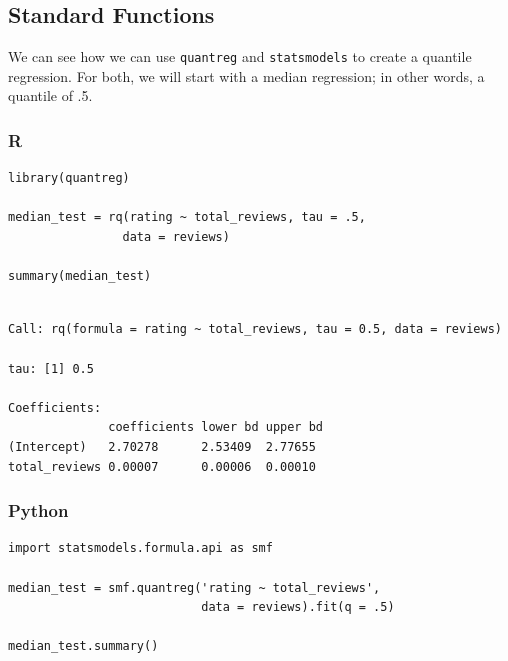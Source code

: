 \documentclass[
  letterpaper,
]{krantz}
\begin{document}
\subsection{Standard Functions}\label{sec-quantile-standard}

We can see how we can use \texttt{quantreg} and \texttt{statsmodels} to
create a quantile regression. For both, we will start with a median
regression; in other words, a quantile of .5.

\subsubsection{R}

\begin{verbatim}
library(quantreg)

median_test = rq(rating ~ total_reviews, tau = .5, 
                data = reviews)

summary(median_test)
\end{verbatim}

\begin{verbatim}

Call: rq(formula = rating ~ total_reviews, tau = 0.5, data = reviews)

tau: [1] 0.5

Coefficients:
              coefficients lower bd upper bd
(Intercept)   2.70278      2.53409  2.77655 
total_reviews 0.00007      0.00006  0.00010 
\end{verbatim}

\subsubsection{Python}

\begin{verbatim}
import statsmodels.formula.api as smf

median_test = smf.quantreg('rating ~ total_reviews', 
                           data = reviews).fit(q = .5)
                           
median_test.summary()                           
\end{verbatim}
\end{document}
